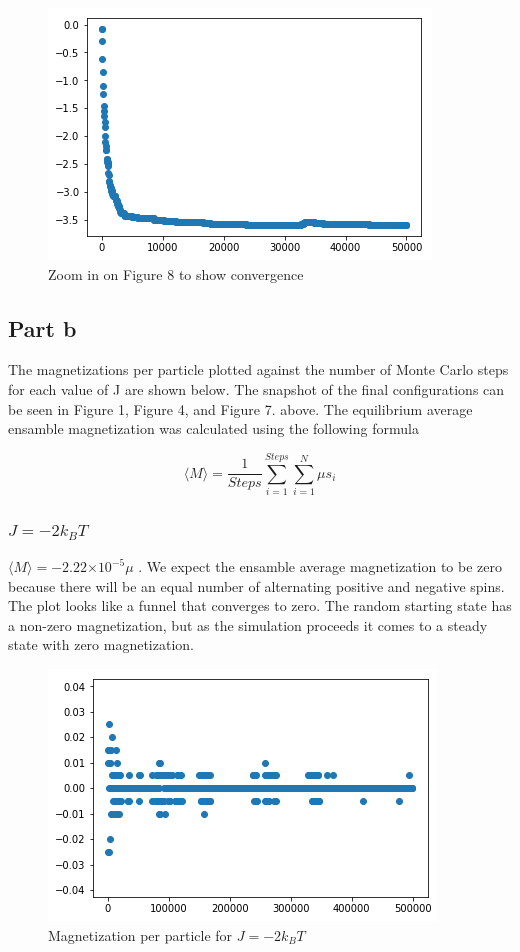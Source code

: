 \documentclass{article}
\providecommand{\e}[1]{\ensuremath{\times 10^{#1}}}
\begin{document}
	\begin{figure}[H]
		\centering
		\includegraphics[scale=0.75]{J=2d}
		\caption{Zoom in on Figure 8 to show convergence}
	\end{figure}
	
 
\subsection*{Part b}
 	The magnetizations per particle plotted against the number of Monte Carlo steps for each value of J are shown below. The snapshot of the final configurations can be seen in Figure 1, Figure 4, and Figure 7. above. The equilibrium average ensamble magnetization was calculated using the following formula

 	\[\langle M \rangle = \frac{1}{Steps} \sum_{i=1}^{Steps} \sum_{i=1}^N \mu s_i\]

	\subsubsection*{$J=-2k_BT $}
		$\langle M \rangle = -2.22\e{-5} \mu$ . We expect the ensamble average magnetization to be zero because there will be an equal number of alternating positive and negative spins. The plot looks like a funnel that converges to zero. The random starting state has a non-zero magnetization, but as the simulation proceeds it comes to a steady state with zero magnetization.
		\begin{figure}[H]
			\centering
			\includegraphics[scale=0.5]{J=-2m}
			\caption{Magnetization per particle for $J=-2k_BT$}
		\end{figure}
\end{document}
